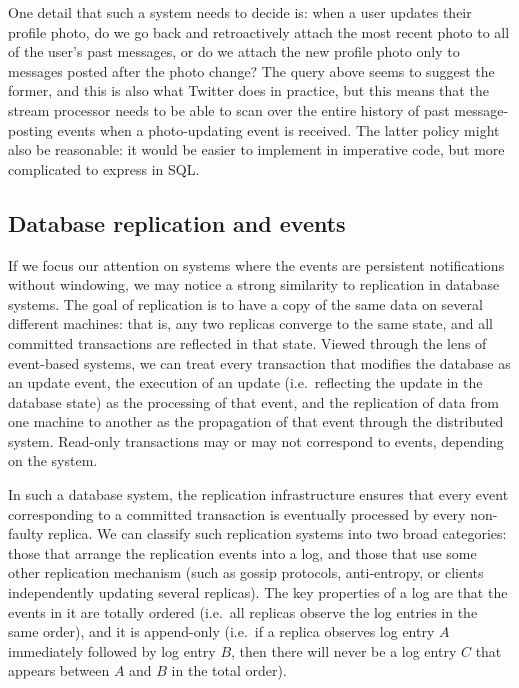 \documentclass[sigconf,nonacm]{acmart}
\begin{document}
One detail that such a system needs to decide is: when a user updates their profile photo, do we go back and retroactively attach the most recent photo to all of the user's past messages, or do we attach the new profile photo only to messages posted after the photo change?
The query above seems to suggest the former, and this is also what Twitter does in practice, but this means that the stream processor needs to be able to scan over the entire history of past message-posting events when a photo-updating event is received.
The latter policy might also be reasonable: it would be easier to implement in imperative code, but more complicated to express in SQL.

\subsection{Database replication and events}\label{sec:replication}

If we focus our attention on systems where the events are persistent notifications without windowing, we may notice a strong similarity to replication in database systems.
The goal of replication is to have a copy of the same data on several different machines: that is, any two replicas converge to the same state, and all committed transactions are reflected in that state.
Viewed through the lens of event-based systems, we can treat every transaction that modifies the database as an update event, the execution of an update (i.e.\ reflecting the update in the database state) as the processing of that event, and the replication of data from one machine to another as the propagation of that event through the distributed system.
Read-only transactions may or may not correspond to events, depending on the system.

In such a database system, the replication infrastructure ensures that every event corresponding to a committed transaction is eventually processed by every non-faulty replica.
We can classify such replication systems into two broad categories: those that arrange the replication events into a log, and those that use some other replication mechanism (such as gossip protocols, anti-entropy, or clients independently updating several replicas).
The key properties of a log are that the events in it are totally ordered (i.e.\ all replicas observe the log entries in the same order), and it is append-only (i.e.\ if a replica observes log entry $A$ immediately followed by log entry $B$, then there will never be a log entry $C$ that appears between $A$ and $B$ in the total order).
\end{document}
